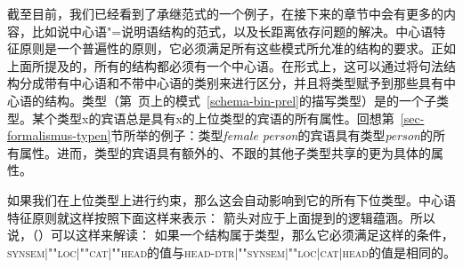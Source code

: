 截至目前，我们已经看到了承继范式的一个例子，在接下来的章节中会有更多的内容，比如说中心语"=说明语结构的范式，以及长距离依存问题的解决。中心语特征原则是一个普遍性的原则，它必须满足所有这些模式所允准的结构的要求。正如上面所提及的，所有的结构都必须有一个中心语。在形式上，这可以通过将句法结构分成带有中心语和不带中心语的类别来进行区分，并且将类型赋予到那些具有中心语的结构。类型（第~\pageref{schema-bin-prel}页上的模式~\ref{schema-bin-prel}的描写类型）是的一个子类型。某个类型x的宾语总是具有x的上位类型的宾语的所有属性。回想第~\ref{sec-formalismus-typen}节所举的例子：类型\textit{female person}的宾语具有类型\textit{person}的所有属性。进而，类型的宾语具有额外的、不跟的其他子类型共享的更为具体的属性。

如果我们在上位类型上进行约束，那么这会自动影响到它的所有下位类型。中心语特征原则就这样按照下面这样来表示：
\ea
{} \impl
{} 
\z
箭头\is{\impl}对应于上面提到的逻辑蕴涵。所以说，（）可以这样来解读：
如果一个结构属于类型，那么它必须满足这样的条件，\textsc{synsem$|$""loc$|$""cat$|$""head}的值与\textsc{head-dtr$|$""synsem$|$""loc$|$cat$|$head}的值是相同的。

